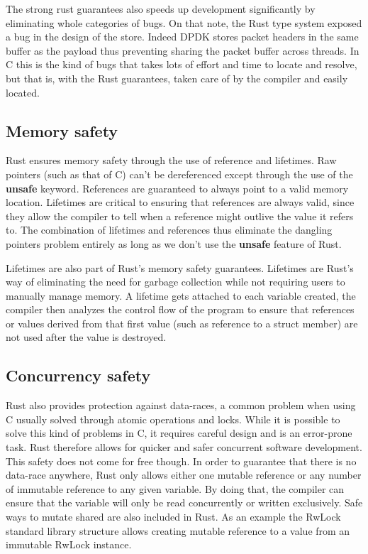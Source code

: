 \documentclass[11pt]{article}
\begin{document}
The strong rust guarantees also speeds up development significantly by
eliminating whole categories of bugs. On that note, the Rust type
system exposed a bug in the design of the store. Indeed DPDK stores
packet headers in the same buffer as the payload thus preventing
sharing the packet buffer across threads. In C this is the kind of
bugs that takes lots of effort and time to locate and resolve, but
that is, with the Rust guarantees, taken care of by the compiler and
easily located.

\subsection{Memory safety}

Rust ensures memory safety through the use of reference and
lifetimes. Raw pointers (such as that of C) can't be dereferenced
except through the use of the \textbf{unsafe} keyword. References are
guaranteed to always point to a valid memory location. Lifetimes are
critical to ensuring that references are always valid, since they
allow the compiler to tell when a reference might outlive the value it
refers to. The combination of lifetimes and references thus eliminate
the dangling pointers problem entirely as long as we don't use the
\textbf{unsafe} feature of Rust.

Lifetimes are also part of Rust's memory safety guarantees. Lifetimes
are Rust's way of eliminating the need for garbage collection while
not requiring users to manually manage memory. A lifetime gets
attached to each variable created, the compiler then analyzes the
control flow of the program to ensure that references or values
derived from that first value (such as reference to a struct member)
are not used after the value is destroyed.

\subsection{Concurrency safety}
Rust also provides protection against data-races, a common problem
when using C usually solved through atomic operations and locks.
While it is possible to solve this kind of problems in C, it requires
careful design and is an error-prone task. Rust therefore allows for
quicker and safer concurrent software development. This safety does not
come for free though. In order to guarantee that there is no data-race
anywhere, Rust only allows either one mutable reference or any number
of immutable reference to any given variable. By doing that, the
compiler can ensure that the variable will only be read concurrently
or written exclusively. Safe ways to mutate shared are also included
in Rust. As an example the RwLock standard library structure allows
creating mutable reference to a value from an immutable RwLock
instance.
\end{document}
